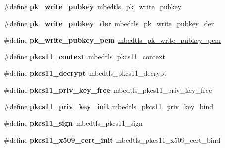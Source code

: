 \begin{DoxyCompactItemize}
\item 
\mbox{\label{compat-1_83_8h_a5460fdb3e10fa44b815fe079617e92ff}} 
\#define {\bfseries pk\+\_\+write\+\_\+pubkey}~\mbox{\hyperlink{pk_8h_accf9dd8e63389e467a59a04f791efc0f}{mbedtls\+\_\+pk\+\_\+write\+\_\+pubkey}}
\item 
\mbox{\label{compat-1_83_8h_a24e72a964913e931e72ba84fe6f93d64}} 
\#define {\bfseries pk\+\_\+write\+\_\+pubkey\+\_\+der}~\mbox{\hyperlink{pk_8h_af5b7c3953ad6fe8be09d35508ee569f6}{mbedtls\+\_\+pk\+\_\+write\+\_\+pubkey\+\_\+der}}
\item 
\mbox{\label{compat-1_83_8h_a8d73e5ca982c50203b3671d4c624bc93}} 
\#define {\bfseries pk\+\_\+write\+\_\+pubkey\+\_\+pem}~\mbox{\hyperlink{pk_8h_a7a26c73637e652bbc1946e5d1e9eee3a}{mbedtls\+\_\+pk\+\_\+write\+\_\+pubkey\+\_\+pem}}
\item 
\mbox{\label{compat-1_83_8h_a33925791aa604ee0b1ea86397d1b9202}} 
\#define {\bfseries pkcs11\+\_\+context}~mbedtls\+\_\+pkcs11\+\_\+context
\item 
\mbox{\label{compat-1_83_8h_a6de067c5cc44e7a08ac8f3ca22e0f204}} 
\#define {\bfseries pkcs11\+\_\+decrypt}~mbedtls\+\_\+pkcs11\+\_\+decrypt
\item 
\mbox{\label{compat-1_83_8h_ad6af86b2be65521f4555142a9dd8f7ae}} 
\#define {\bfseries pkcs11\+\_\+priv\+\_\+key\+\_\+free}~mbedtls\+\_\+pkcs11\+\_\+priv\+\_\+key\+\_\+free
\item 
\mbox{\label{compat-1_83_8h_a7178615c3b948b0295753132b7cab38d}} 
\#define {\bfseries pkcs11\+\_\+priv\+\_\+key\+\_\+init}~mbedtls\+\_\+pkcs11\+\_\+priv\+\_\+key\+\_\+bind
\item 
\mbox{\label{compat-1_83_8h_a54f1bafeab5c8d40d1371a4c4cfa0cae}} 
\#define {\bfseries pkcs11\+\_\+sign}~mbedtls\+\_\+pkcs11\+\_\+sign
\item 
\mbox{\label{compat-1_83_8h_af503b6a37d44e05a21eba98d84de27e4}} 
\#define {\bfseries pkcs11\+\_\+x509\+\_\+cert\+\_\+init}~mbedtls\+\_\+pkcs11\+\_\+x509\+\_\+cert\+\_\+bind
\item 

\end{DoxyCompactItemize}
